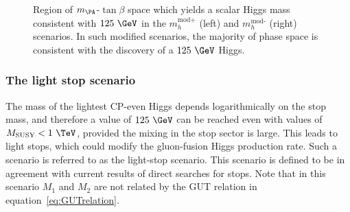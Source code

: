 \begin{figure}[htbp]
\caption[Region of $m_{\PA}$-$\tan\beta$ space which yields a scalar Higgs mass 
consistent with $125~\GeV$ in the $m_{h}^{\text{mod}}$ scenarios.]
{Region of $m_{\PA}$-$\tan\beta$ space which yields a scalar Higgs mass 
consistent with $125~\GeV$ in the $m_{h}^{\text{mod+}}$ (left) and
$m_{h}^{\text{mod-}}$ (right) scenarios. In such modified scenarios, the
majority of phase space is consistent with the discovery of a $125~\GeV$ Higgs.}
\label{fig:mhmodmass}
\end{figure}

\subsubsection{The light stop scenario}
\label{sec:lightstopscenario}

The mass of the lightest CP-even Higgs depends logarithmically on the stop mass,
and therefore a value of $125~\GeV$ can be reached even with values of
$M_{\text{SUSY}} < 1~\TeV$, provided the mixing in the stop sector is large. This
leads to light stops, which could modify the gluon-fusion Higgs production rate.
Such a scenario is referred to as the light-stop scenario. This scenario is
defined to be in agreement with current results of direct searches for stops.
Note that in this scenario $M_{1}$ and $M_{2}$ are not related by the GUT
relation in equation~\ref{eq:GUTrelation}. 

